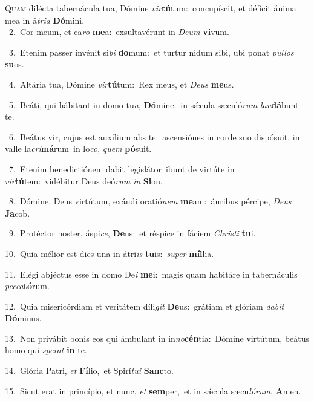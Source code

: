 \lettrine{\initial\textcolor{\initialcolor}{Q}}{uam} dilécta tabernácula tua, Dómine \textit{vir}\-\textbf{tú}tum:~\star concupíscit, et déficit ánima mea in á\-\textit{tri}\-\textit{a} \textbf{Dó}\-mini.\\
{\numbfont\textcolor{\numbcolor}{~2.}}~Cor meum, et ca\textit{ro} \textbf{me}\-a:~\star exsultavérunt in \textit{De}\-\textit{um} \textbf{vi}\-vum.\par
{\numbfont\textcolor{\numbcolor}{~3.}}~Etenim passer invénit si\textit{bi} \textbf{do}\-mum:~\star et turtur nidum sibi, ubi ponat \textit{pul}\-\textit{los} \textbf{su}\-os.\par
{\numbfont\textcolor{\numbcolor}{~4.}}~Altária tua, Dómine \textit{vir}\-\textbf{tú}tum:~\star Rex meus, et \textit{De}\-\textit{us} \textbf{me}\-us.\par
{\numbfont\textcolor{\numbcolor}{~5.}}~Beáti, qui hábitant in domo tu\-\textit{a}\-, \textbf{Dó}\-mine:~\star in sǽcula sæculó\textit{rum} \textit{lau}\-\textbf{dá}bunt te.\par
{\numbfont\textcolor{\numbcolor}{~6.}}~Beátus vir, cujus est auxílium abs te:~\dagger ascensiónes in corde suo dispósuit, in valle la\-\textit{cri}\-\textbf{má}rum~\star in lo\-\textit{co}\-, \textit{quem} \textbf{pó}\-suit.\par
{\numbfont\textcolor{\numbcolor}{~7.}}~Etenim benedictiónem dabit legislátor~\dagger ibunt de virtúte in \textit{vir}\-\textbf{tú}tem:~\star vidébitur Deus deó\textit{rum} \textit{in} \textbf{Si}\-on.\par
{\numbfont\textcolor{\numbcolor}{~8.}}~Dómine, Deus virtútum, exáudi oratió\textit{nem} \textbf{me}\-am:~\star áuribus pércipe, \textit{De}\-\textit{us} \textbf{Ja}\-cob.\par
{\numbfont\textcolor{\numbcolor}{~9.}}~Protéctor noster, áspi\-\textit{ce}\-, \textbf{De}\-us:~\star et réspice in fáciem \textit{Chris}\-\textit{ti} \textbf{tu}\-i.\par
{\numbfont\textcolor{\numbcolor}{10.}}~Quia mélior est dies una in átri\textit{is} \textbf{tu}\-is:~\star \textit{su}\-\textit{per} \textbf{míl}\-lia.\par
{\numbfont\textcolor{\numbcolor}{11.}}~Elégi abjéctus esse in domo De\textit{i} \textbf{me}\-i:~\star magis quam habitáre in tabernáculis \textit{pec}\-\textit{ca}\textbf{tó}rum.\par
{\numbfont\textcolor{\numbcolor}{12.}}~Quia misericórdiam et veritátem díli\textit{git} \textbf{De}\-us:~\star grátiam et glóriam \textit{da}\-\textit{bit} \textbf{Dó}\-minus.\par
{\numbfont\textcolor{\numbcolor}{13.}}~Non privábit bonis eos qui ámbulant in in\-\textit{no}\-\textbf{cén}tia:~\star Dómine virtútum, beátus homo qui \textit{spe}\-\textit{rat} \textbf{in} te.\par
{\numbfont\textcolor{\numbcolor}{14.}}~Glória Patri, \textit{et} \textbf{Fí}\-lio,~\star et Spirí\-\textit{tu}\-\textit{i} \textbf{Sanc}\-to.\par
{\numbfont\textcolor{\numbcolor}{15.}}~Sicut erat in princípio, et nunc, \textit{et} \textbf{sem}\-per,~\star et in sǽcula sæcu\-\textit{ló}\-\textit{rum}. \textbf{A}\-men.\par
